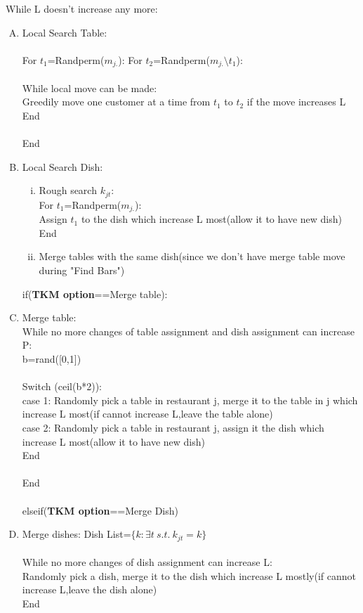 \documentclass{article}
\begin{document}
\begin{spacing}{1.1}
While L doesn't increase any more:\\
\begin{enumerate}[(A)]
\item Local Search Table:\\ \\
For $t_{1}$=Randperm($m_{j.}$):
For $t_{2}$=Randperm($m_{j.}\setminus t_{1}$):\\ \\
While local move can be made:\\
Greedily move one customer at a time from $t_{1}$ to $t_{2}$ if the move increases L \\
End\\ \\
End
\item Local Search Dish:\\
\begin{enumerate}[(i)]
\item Rough search $k_{jt}$:\\
For $t_{1}$=Randperm($m_{j.}$):\\
Assign $t_{1}$ to the dish which increase L most(allow it to have new dish)\\
End
\item Merge tables with the same dish(since we don't have merge table move during "Find Bars")\\
\end{enumerate}
if({\bf TKM option}==Merge table):
\item Merge table:\\
 While no more changes of table assignment and dish assignment can increase P:\\
 b=rand([0,1]) \\ \\
 Switch (ceil(b*2)):\\
 case 1: Randomly pick a table in restaurant j, merge it to the table in j which increase L most(if cannot increase L,leave the table alone)\\
 case 2: Randomly pick a table in restaurant j, assign it the dish which increase L most(allow it to have new dish)\\
 End\\ \\
 End\\ \\
elseif({\bf TKM option}==Merge Dish)
\item Merge dishes:
 Dish List=$\{k:\exists t \ s.t. \ k_{jt}=k\}$\\ \\
 While no more changes of dish assignment can increase L:\\
 Randomly pick a dish, merge it to the dish which increase L mostly(if cannot increase L,leave the dish alone)\\
 End\\
\end{enumerate}  



\end{spacing}
\end{document}
